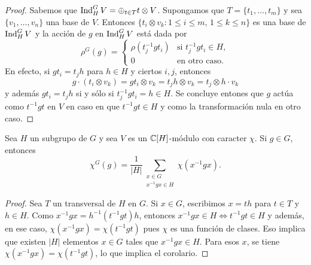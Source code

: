 \begin{proof}
    Sabemos que $\operatorname{Ind}_H^GV=\oplus_{t\in T}t\otimes V$. 
    Supongamos que $T=\{t_1,\dots,t_m\}$ 
    y sea $\{v_1,\dots,v_n\}$ una base de $V$. 
    Entonces $\{t_i\otimes v_k:1\leq i\leq m,\,1\leq k\leq n\}$ es 
    una base de $\operatorname{Ind}_H^GV$ y la acción
    de $g$ en $\operatorname{Ind}_H^GV$ está dada por
    \[
    \rho^G(g)=\begin{cases}
    \rho(t_j^{-1}gt_i) & \text{si $t_j^{-1}gt_i\in H$},\\
    0 & \text{en otro caso}.
    \end{cases}
    \]
    En efecto, si $gt_i=t_jh$ para $h\in H$ y ciertos $i,j$, entonces 
    \[
    g\cdot (t_i\otimes v_k)=gt_i\otimes v_k=t_jh\otimes v_k=t_j\otimes h\cdot v_k
    \]
    y además $gt_i=t_jh$ si y sólo si $t_j^{-1}gt_i=h\in H$. Se concluye entones
    que $g$ actúa como $t^{-1}gt$ en $V$ en caso en que $t^{-1}gt\in H$ y 
    como la transformación nula en otro caso. 
\end{proof}

\begin{corollary}
\label{cor:induccion}
    Sea $H$ un subgrupo de $G$ 
    y sea $V$ es un $\mathbb{C}[H]$-módulo con caracter $\chi$.
    Si $g\in G$, entonces
    \[
    \chi^G(g)=\frac{1}{|H|}\sum_{\substack{x\in G\\x^{-1}gx\in H}}\chi(x^{-1}gx).
    \]
\end{corollary}

\begin{proof}
    Sea $T$ un transversal de $H$ en $G$. Si $x\in G$, escribimos $x=th$ para $t\in T$ y $h\in H$. 
    Como $x^{-1}gx=h^{-1}(t^{-1}gt)h$, entonces $x^{-1}gx\in H\Longleftrightarrow t^{-1}gt\in H$ y además, en ese caso, 
    $\chi(x^{-1}gx)=\chi(t^{-1}gt)$ pues $\chi$ es una función de clases. Eso implica que existen $|H|$ elementos $x\in G$ 
    tales que $x^{-1}gx\in H$. Para esos $x$, se tiene $\chi(x^{-1}gx)=\chi(t^{-1}gt)$, lo que implica 
    el corolario. 
\end{proof}